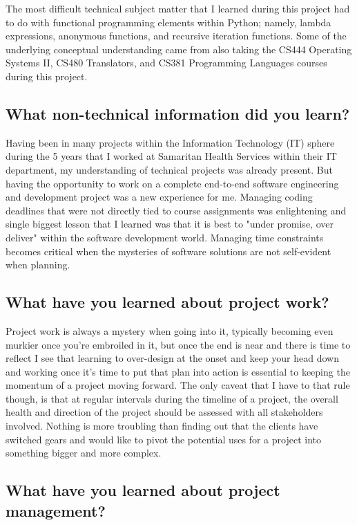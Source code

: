 \documentclass[11pt]{scrreprt}
\begin{document}
The most difficult technical subject matter that I learned during this project had to do with functional programming elements within Python; namely, lambda expressions, anonymous functions, and recursive iteration functions. Some of the underlying conceptual understanding came from also taking the CS444 Operating Systems II, CS480 Translators, and CS381 Programming Languages courses during this project.

\subsection{What non-technical information did you learn?}

Having been in many projects within the Information Technology (IT) sphere during the 5 years that I worked at Samaritan Health Services within their IT department, my understanding of technical projects was already present. But having the opportunity to work on a complete end-to-end software engineering and development project was a new experience for me. Managing coding deadlines that were not directly tied to course assignments was enlightening and single biggest lesson that I learned was that it is best to "under promise, over deliver" within the software development world. Managing time constraints becomes critical when the mysteries of software solutions are not self-evident when planning.

\subsection{What have you learned about project work?}

Project work is always a mystery when going into it, typically becoming even murkier once you're embroiled in it, but once the end is near and there is time to reflect I see that learning to over-design at the onset and keep your head down and working once it's time to put that plan into action is essential to keeping the momentum of a project moving forward.
The only caveat that I have to that rule though, is that at regular intervals during the timeline of a project, the overall health and direction of the project should be assessed with all stakeholders involved. Nothing is more troubling than finding out that the clients have switched gears and would like to pivot the potential uses for a project into something bigger and more complex.

\subsection{What have you learned about project management?}
\end{document}
